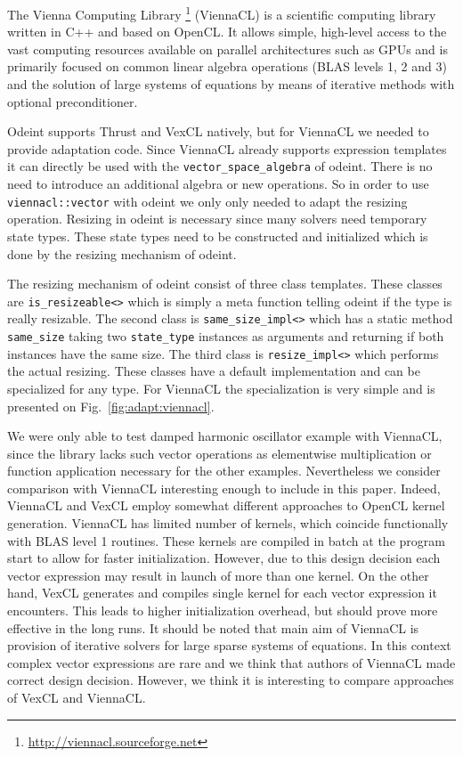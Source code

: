 \documentclass[1p]{elsarticle}
\newcommand{\code}[1]{\lstinline|#1|}
\newcommand{\figref}[1]{Fig.~\ref{#1}}
\begin{document}
The Vienna Computing Library%
\footnote{\href{http://viennacl.sourceforge.net}{http://viennacl.sourceforge.net}}
(ViennaCL) is a scientific computing library written in C++ and based on
OpenCL. It allows simple, high-level access to the vast computing resources
available on parallel architectures such as GPUs and is primarily focused on
common linear algebra operations (BLAS levels 1, 2 and 3) and the solution of
large systems of equations by means of iterative methods with optional
preconditioner.

Odeint supports Thrust and VexCL natively, but for ViennaCL we needed to
provide adaptation code. Since ViennaCL already supports expression templates
it can directly be used with the \code{vector_space_algebra} of odeint. There
is no need to introduce an additional algebra or new operations. So in order to
use \code{viennacl::vector} with odeint we only only needed to adapt the
resizing operation. Resizing in odeint is necessary since many solvers need
temporary state types. These state types need to be constructed and initialized
which is done by the resizing mechanism of odeint.

The resizing mechanism of odeint consist of three class templates. These
classes are \code{is_resizeable<>} which is simply a meta function telling
odeint if the type is really resizable. The second class is
\code{same_size_impl<>} which has a static method \code{same_size} taking two
\code{state_type} instances as arguments and returning if both instances have
the same size. The third class is \code{resize_impl<>} which performs the
actual resizing. These classes have a default implementation and can be
specialized for any type.  For ViennaCL the specialization is very simple and
is presented on \figref{fig:adapt:viennacl}.

We were only able to test damped harmonic oscillator example with ViennaCL,
since the library lacks such vector operations as elementwise multiplication or
function application necessary for the other examples.  Nevertheless we
consider comparison with ViennaCL interesting enough to include in this paper.
Indeed, ViennaCL and VexCL employ somewhat different approaches to OpenCL
kernel generation. ViennaCL has limited number of kernels, which coincide
functionally with BLAS level 1 routines. These kernels are compiled in batch at
the program start to allow for faster initialization. However, due to this
design decision each vector expression may result in launch of more than one
kernel.  On the other hand, VexCL generates and compiles single kernel for each
vector expression it encounters.  This leads to higher initialization overhead,
but should prove more effective in the long runs. It should be noted that main
aim of ViennaCL is provision of iterative solvers for large sparse systems of
equations. In this context complex vector expressions are rare and we think
that authors of ViennaCL made correct design decision.  However, we think it is
interesting to compare approaches of VexCL and ViennaCL.
\end{document}
